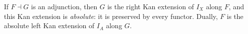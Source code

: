 If $F \dashv G$ is an adjunction, then $G$ is the right Kan extension of $I_X$ along $F$, and this Kan extension is \emph{absolute}: it is preserved by every functor. Dually, $F$ is the absolute left Kan extension of $I_A$ along $G$.
